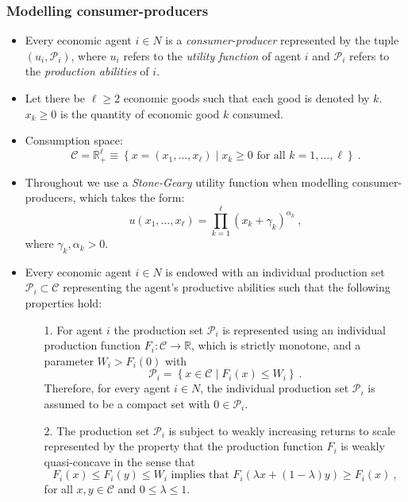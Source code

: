 \documentclass[10pt]{beamer}
\begin{document}
\begin{frame} \frametitle{Modelling consumer-producers}
\begin{itemize}
\item Every economic agent $i \in N$ is a \emph{consumer-producer} represented by the tuple $(u_{i}, \mathcal{P}_{i})$, where $u_{i}$ refers to the \emph{utility function} of agent $i$ and $\mathcal{P}_{i}$ refers to the \emph{production abilities} of $i$.
\medskip
\item Let there be $\ell \geqslant 2$ economic goods such that each good is denoted by $k$. $x_{k} \geqslant 0$ is the quantity of economic good $k$ consumed.
\medskip
\item Consumption space: 
\begin{equation*}
\mathcal{C} = \mathbb{R}^{\ell}_{+} \equiv \left\{ x = (x_{1}, \ldots, x_{\ell}) \mid x_{k} \geqslant 0 \mbox{~for all~} k = 1, \ldots, \ell \right\}~.
\end{equation*}
\item Throughout we use a \emph{Stone-Geary} utility function when modelling consumer-producers, which takes the form:
\begin{equation*}
u \left(x_{1}, \ldots, x_{\ell} \right) = \prod_{k=1}^{\ell} \left( x_{k} + \gamma_{k} \right)^{\alpha_{k}}~,
\end{equation*}
where $\gamma_{k}, \alpha_{k} > 0$.
\end{itemize}
\end{frame}

\begin{frame}
\begin{itemize}
\item Every economic agent $i \in N$ is endowed with an individual production set $\mathcal{P}_{i} \subset \mathcal{C}$ representing the agent’s productive abilities such that the following properties hold:
\medskip
\begin{itemize}
\item[1.] For agent $i$ the production set $\mathcal{P}_{i}$ is represented using an individual production function $F_{i} : \mathcal{C} \rightarrow \mathbb{R}$, which is strictly monotone, and a parameter $W_{i} > F_{i}(0)$ with
\begin{equation*}
\mathcal{P}_{i} = \left\{x \in \mathcal{C} \mid F_{i}(x) \leqslant W_{i} \right\}~.
\end{equation*}
\medskip
Therefore, for every agent $i \in N$, the individual production set $\mathcal{P}_{i}$ is assumed to be a compact set with $0 \in \mathcal{P}_{i}$.
\medskip
\item[2.] The production set $\mathcal{P}_{i}$ is subject to weakly increasing returns to scale represented by the property that the production function $F_{i}$ is weakly quasi-concave in the sense that
\begin{equation*}
F_{i}(x) \leqslant F_{i}(y) \leqslant W_{i} \mbox{~implies that~} F_{i} \left( \lambda x + (1 - \lambda) y \right) \geqslant F_{i}(x)~,
\end{equation*}
\medskip
for all $x, y \in \mathcal{C}$ and $0 \leqslant \lambda \leqslant 1$.
\end{itemize}
\end{itemize}
\end{frame}
\end{document}
